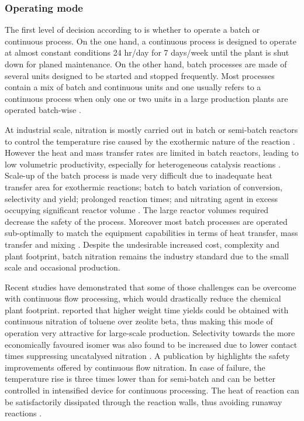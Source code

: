 \subsubsection{Operating mode} %
\label{sec:continuous}
The first level of decision according to \textcite{douglas_conceptual_1988} is whether to operate a batch or continuous process. On the one hand, a continuous process is designed to operate at almost constant conditions 24 hr/day for 7 days/week until the plant is shut down for planed maintenance. On the other hand, batch processes are made of several units designed to be started and stopped frequently. Most processes contain a mix of batch and continuous units and one usually refers to a continuous process when only one or two units in a large production plants are operated batch-wise \cite{douglas_conceptual_1988}. 

At industrial scale, nitration is mostly carried out in batch or semi-batch reactors to control the temperature rise caused by the exothermic nature of the reaction \cite{booth_nitro_2000,dugal_nitrobenzene_2005}. However the heat and mass transfer rates are limited in batch reactors, leading to low volumetric productivity, especially for heterogeneous catalysis reactions \cite{randall_process_2020}. Scale-up of the batch process is made very difficult due to inadequate heat transfer area for exothermic reactions; batch to batch variation of conversion, selectivity and yield; prolonged reaction times; and nitrating agent in excess occupying significant reactor volume \cite{kulkarni_continuous_2014}. The large reactor volumes required decrease the safety of the process. Moreover most batch processes are operated sub-optimally to match the equipment capabilities in terms of heat transfer, mass transfer and mixing \cite{randall_process_2020}. Despite the undesirable increased cost, complexity and plant footprint, batch nitration remains the industry standard due to the small scale and occasional production. 

Recent studies have demonstrated that some of those challenges can be overcome with continuous flow processing, which would drastically reduce the chemical plant footprint. \textcite{kuba_batch_2007} reported that higher weight time yields could be obtained with continuous nitration of toluene over zeolite beta, thus making this mode of operation very attractive for large-scale production. Selectivity towards the more economically favoured \para isomer was also found to be increased due to lower contact times suppressing uncatalysed nitration \cite{kuba_batch_2007}. A publication by \textcite{di_miceli_raimondi_safety_2015} highlights the safety improvements offered by continuous flow nitration. In case of failure, the temperature rise is three times lower than for semi-batch and can be better controlled in intensified device for continuous processing. The heat of reaction can be satisfactorily dissipated through the reaction walls, thus avoiding runaway reactions \cite{di_miceli_raimondi_safety_2015}. 

